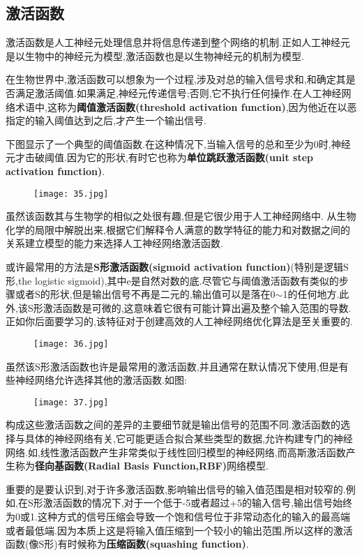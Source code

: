 \documentclass[11pt,a4paper,oneside]{book}
\begin{document}
\subsection{激活函数}
激活函数是人工神经元处理信息并将信息传递到整个网络的机制.正如人工神经元是以生物中的神经元为模型,激活函数也是以生物神经元的机制为模型.

在生物世界中,激活函数可以想象为一个过程,涉及对总的输入信号求和,和确定其是否满足激活阈值.如果满足,神经元传递信号;否则,它不执行任何操作.在人工神经网络术语中,这称为\textbf{阈值激活函数(threshold activation function)},因为他近在以恶指定的输入阈值达到之后,才产生一个输出信号.

下图显示了一个典型的阈值函数.在这种情况下,当输入信号的总和至少为0时,神经元才击破阈值.因为它的形状,有时它也称为\textbf{单位跳跃激活函数(unit step activation function)}.
\begin{figure}[H]
	\centering
	\texttt{[image: 35.jpg]}
\end{figure}

虽然该函数其与生物学的相似之处很有趣,但是它很少用于人工神经网络中. 从生物化学的局限中解脱出来,根据它们解释令人满意的数学特征的能力和对数据之间的关系建立模型的能力来选择人工神经网络激活函数.

或许最常用的方法是\textbf{S形激活函数(sigmoid activation function)}(特别是逻辑S形,the logistic sigmoid),其中e是自然对数的底.尽管它与阈值激活函数有类似的步骤或者S的形状,但是输出信号不再是二元的,输出值可以是落在0$\sim$1的任何地方.此外,该S形激活函数是可微的,这意味着它很有可能计算出遍及整个输入范围的导数.正如你后面要学习的,该特征对于创建高效的人工神经网络优化算法是至关重要的.
\begin{figure}[H]
	\centering
	\texttt{[image: 36.jpg]}
\end{figure}
 虽然该S形激活函数也许是最常用的激活函数,并且通常在默认情况下使用,但是有些神经网络允许选择其他的激活函数.如图:
\begin{figure}[H]
	\centering
	\texttt{[image: 37.jpg]}
\end{figure}
构成这些激活函数之间的差异的主要细节就是输出信号的范围不同.激活函数的选择与具体的神经网络有关,它可能更适合拟合某些类型的数据,允许构建专门的神经网络.如,线性激活函数产生非常类似于线性回归模型的神经网络,而高斯激活函数产生称为\textbf{径向基函数(Radial Basis Function,RBF)}网络模型.

重要的是要认识到,对于许多激活函数,影响输出信号的输入值范围是相对较窄的.例如,在S形激活函数的情况下,对于一个低于-5或者超过+5的输入信号,输出信号始终为0或1.这种方式的信号压缩会导致一个饱和信号位于非常动态化的输入的最高端或者最低端.因为本质上这是将输入值压缩到一个较小的输出范围,所以这样的激活函数(像S形)有时候称为\textbf{压缩函数(squashing function)}.
\end{document}
